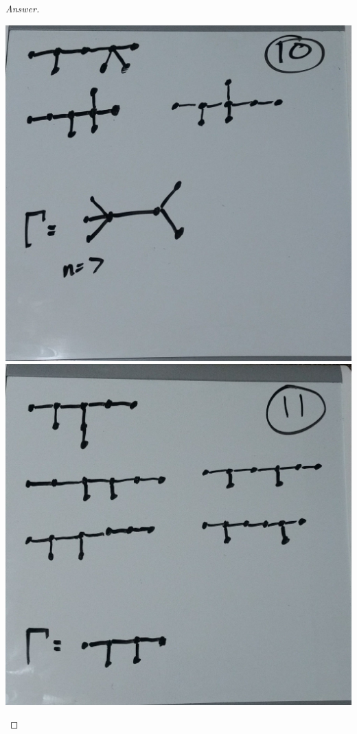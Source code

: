 \documentclass[12pt]{article}
\begin{document}
\begin{proof}[Answer]
\begin{center}
\includegraphics[scale=0.07]{10.jpg}
\hspace{0.05in}
\includegraphics[scale=0.07]{11.jpg}
\end{center}
\end{proof}
\end{document}
